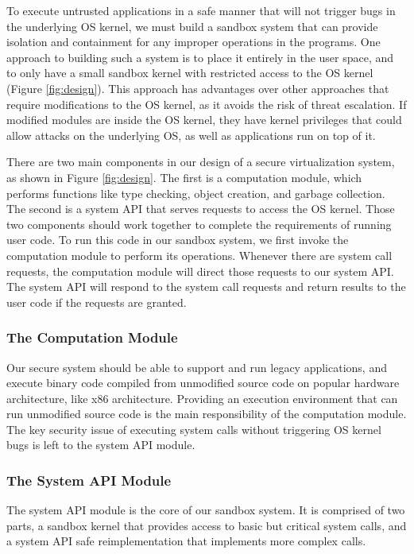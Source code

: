 To execute untrusted applications in a safe manner that will not trigger bugs 
in the underlying OS kernel, %
we must build a sandbox system that can provide isolation and 
containment for any improper operations in the programs. 
One approach to building such a system is to place it entirely in the user space, 
and to only have a small sandbox kernel with restricted access to the OS kernel (Figure \ref{fig:design}). 
This approach has advantages over other approaches that require modifications to 
the OS kernel, as it avoids the risk of threat escalation. If modified modules 
are inside the OS kernel, they have kernel privileges that could allow attacks on the underlying OS, 
as well as applications run on top of it. 

There are two main components in our design of a secure virtualization system, as shown in Figure \ref{fig:design}. 
The first is a computation module, which performs functions like type checking, object creation, 
and garbage collection. The second is a system API that serves requests to access the OS kernel. 
Those two components should work together to complete the requirements of running user code. 
To run this code in our sandbox system, we first invoke the computation module to perform its operations. 
Whenever there are system call requests, 
the computation module will direct those requests to our system API. 
The system API will respond to the system call requests and return results to the user code if the requests are granted. 

\subsubsection{The Computation Module}

Our secure system should be able to support and run legacy applications, 
and execute binary code compiled from unmodified source code on popular hardware architecture, 
like x86 architecture. Providing an execution environment that can run unmodified source code is 
the main responsibility of the computation module. The key security issue of executing system calls 
without triggering OS kernel bugs is left to the system API module.

\subsubsection{The System API Module}

The system API module is the core of our sandbox system. It is comprised of two parts, 
a sandbox kernel that provides access to basic but critical system calls, and a system 
API safe reimplementation that implements more complex calls. 

